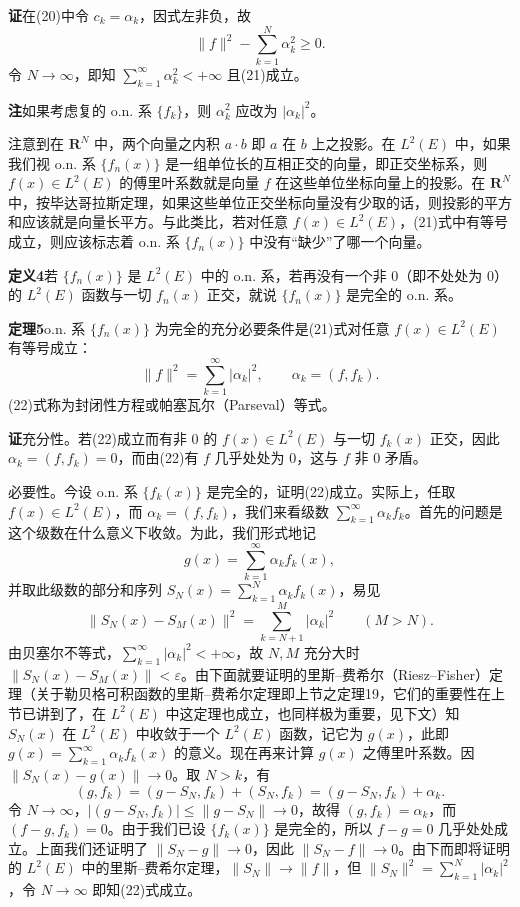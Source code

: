 \noindent\textbf{证}\quad 在(20)中令 $c_k=\alpha_k$，因式左非负，故
\[
 \|f\|^2-\sum_{k=1}^N\alpha_k^2\ge0.
\]
令 $N\to\infty$，即知 $\sum_{k=1}^{\infty}\alpha_k^2<+\infty$ 且(21)成立。

\noindent\textbf{注}\quad 如果考虑复的 o.n. 系 $\{f_k\}$，则 $\alpha_k^2$ 应改为 $|\alpha_k|^2$。

注意到在 $\mathbf R^N$ 中，两个向量之内积 $a\cdot b$ 即 $a$ 在 $b$ 上之投影。在 $L^2(E)$ 中，如果我们视 o.n. 系 $\{f_n(x)\}$ 是一组单位长的互相正交的向量，即正交坐标系，则 $f(x)\in L^2(E)$ 的傅里叶系数就是向量 $f$ 在这些单位坐标向量上的投影。在 $\mathbf R^N$ 中，按毕达哥拉斯定理，如果这些单位正交坐标向量没有少取的话，则投影的平方和应该就是向量长平方。与此类比，若对任意 $f(x)\in L^2(E)$，(21)式中有等号成立，则应该标志着 o.n. 系 $\{f_n(x)\}$ 中没有“缺少”了哪一个向量。

\noindent\textbf{定义4}\quad 若 $\{f_n(x)\}$ 是 $L^2(E)$ 中的 o.n. 系，若再没有一个非 $0$（即不处处为 $0$）的 $L^2(E)$ 函数与一切 $f_n(x)$ 正交，就说 $\{f_n(x)\}$ 是完全的 o.n. 系。

\noindent\textbf{定理5}\quad o.n. 系 $\{f_n(x)\}$ 为完全的充分必要条件是(21)式对任意 $f(x)\in L^2(E)$ 有等号成立：
\begin{equation}
 \|f\|^2=\sum_{k=1}^{\infty}|\alpha_k|^2,\qquad \alpha_k=(f,f_k).
 \tag{22}
\end{equation}
(22)式称为封闭性方程或帕塞瓦尔（Parseval）等式。

\noindent\textbf{证}\quad 充分性。若(22)成立而有非 $0$ 的 $f(x)\in L^2(E)$ 与一切 $f_k(x)$ 正交，因此 $\alpha_k=(f,f_k)=0$，而由(22)有 $f$ 几乎处处为 $0$，这与 $f$ 非 $0$ 矛盾。

必要性。今设 o.n. 系 $\{f_k(x)\}$ 是完全的，证明(22)成立。实际上，任取 $f(x)\in L^2(E)$，而 $\alpha_k=(f,f_k)$，我们来看级数 $\sum_{k=1}^{\infty}\alpha_kf_k$。首先的问题是这个级数在什么意义下收敛。为此，我们形式地记
\[
 g(x)=\sum_{k=1}^{\infty}\alpha_kf_k(x),
\]
并取此级数的部分和序列 $S_N(x)=\sum_{k=1}^N\alpha_kf_k(x)$，易见
\[
 \|S_N(x)-S_M(x)\|^2=\sum_{k=N+1}^{M}|\alpha_k|^2\qquad(M>N).
\]
由贝塞尔不等式，$\sum_{k=1}^{\infty}|\alpha_k|^2<+\infty$，故 $N,M$ 充分大时 $\|S_N(x)-S_M(x)\|<\varepsilon$。由下面就要证明的里斯--费希尔（Riesz--Fisher）定理（关于勒贝格可积函数的里斯--费希尔定理即上节之定理19，它们的重要性在上节已讲到了，在 $L^2(E)$ 中这定理也成立，也同样极为重要，见下文）知 $S_N(x)$ 在 $L^2(E)$ 中收敛于一个 $L^2(E)$ 函数，记它为 $g(x)$，此即 $g(x)=\sum_{k=1}^{\infty}\alpha_kf_k(x)$ 的意义。现在再来计算 $g(x)$ 之傅里叶系数。因 $\|S_N(x)-g(x)\|\to0$。取 $N>k$，有
\[
 (g,f_k)=(g-S_N,f_k)+(S_N,f_k)=(g-S_N,f_k)+\alpha_k.
\]
令 $N\to\infty$，$|(g-S_N,f_k)|\le\|g-S_N\|\to0$，故得 $(g,f_k)=\alpha_k$，而 $(f-g,f_k)=0$。由于我们已设 $\{f_k(x)\}$ 是完全的，所以 $f-g=0$ 几乎处处成立。上面我们还证明了 $\|S_N-g\|\to0$，因此 $\|S_N-f\|\to0$。由下而即将证明的 $L^2(E)$ 中的里斯--费希尔定理，$\|S_N\|\to\|f\|$，但 $\|S_N\|^2=\sum_{k=1}^N|\alpha_k|^2$，令 $N\to\infty$ 即知(22)式成立。

